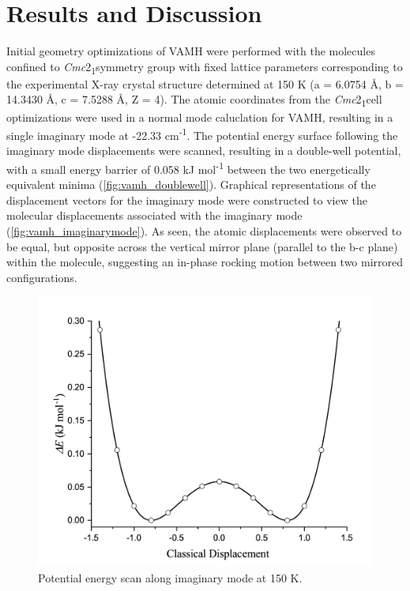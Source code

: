 \section{Results and Discussion}
\par Initial geometry optimizations of VAMH were performed with the molecules confined to \textit{Cmc}2\textsubscript{1}symmetry group with fixed lattice parameters corresponding to the experimental X-ray crystal structure determined at 150 K (a = 6.0754 Å, b = 14.3430 Å, c = 7.5288 Å, Z = 4). The atomic coordinates from the \textit{Cmc}2\textsubscript{1}cell optimizations were used in a normal mode caluclation for VAMH, resulting in a single imaginary mode at -22.33 cm\textsuperscript{-1}. The potential energy surface following the imaginary mode displacements were scanned, resulting in a double-well potential, with a small energy barrier of 0.058 kJ mol\textsuperscript{-1} between the two energetically equivalent minima (\autoref{fig:vamh_doublewell}). Graphical representations of the displacement vectors for the imaginary mode were constructed to view the molecular displacements associated with the imaginary mode (\autoref{fig:vamh_imaginarymode}). As seen, the atomic displacements were observed to be equal, but opposite across the vertical mirror plane (parallel to the b-c plane) within the molecule, suggesting an in-phase rocking motion between two mirrored configurations.

\begin{figure}[htbp]
  \center
  \includegraphics[width=1\linewidth]{src/figures/VAMH_figures/VAMH_potescan.png}
  \caption{Potential energy scan along imaginary mode at 150 K.}
  \label{fig:vamh_doublewell}
\end{figure}

